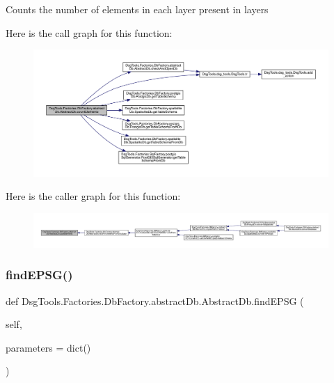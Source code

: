 \begin{DoxyVerb}Counts the number of elements in each layer present in layers
\end{DoxyVerb}
 Here is the call graph for this function\+:
\nopagebreak
\begin{figure}[H]
\begin{center}
\leavevmode
\includegraphics[width=350pt]{class_dsg_tools_1_1_factories_1_1_db_factory_1_1abstract_db_1_1_abstract_db_a4cc7881313a6c579d07c1209739856cb_cgraph}
\end{center}
\end{figure}
Here is the caller graph for this function\+:
\nopagebreak
\begin{figure}[H]
\begin{center}
\leavevmode
\includegraphics[width=350pt]{class_dsg_tools_1_1_factories_1_1_db_factory_1_1abstract_db_1_1_abstract_db_a4cc7881313a6c579d07c1209739856cb_icgraph}
\end{center}
\end{figure}
\mbox{\label{class_dsg_tools_1_1_factories_1_1_db_factory_1_1abstract_db_1_1_abstract_db_a757b802e1e162e035b7083af89959575}} 
\subsubsection{\texorpdfstring{find\+E\+P\+S\+G()}{findEPSG()}}
{\footnotesize\ttfamily def Dsg\+Tools.\+Factories.\+Db\+Factory.\+abstract\+Db.\+Abstract\+Db.\+find\+E\+P\+SG (\begin{DoxyParamCaption}\item[{}]{self,  }\item[{}]{parameters = {\ttfamily dict()} }\end{DoxyParamCaption})}

